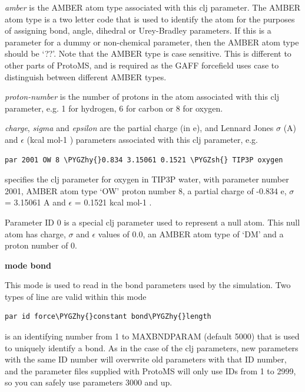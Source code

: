 \documentclass[letterpaper,10pt,english]{sphinxmanual}
\def\PYGZsh{\char`\#}
\def\PYGZhy{\char`\-}
\begin{document}
\emph{amber} is the AMBER atom type associated with this clj parameter. The AMBER atom type is a two letter code that is used to identify the atom for the purposes of assigning bond, angle, dihedral or Urey-Bradley parameters. If this is a parameter for a dummy or non-chemical parameter, then the AMBER atom type should be ‘??’. Note that the AMBER type is case sensitive. This is different to other parts of ProtoMS, and is required as the GAFF forcefield uses case to distinguish between different AMBER types.

\emph{proton-number} is the number of protons in the atom associated with this clj parameter, e.g. 1 for hydrogen, 6 for carbon or 8 for oxygen.

\emph{charge}, \emph{sigma} and \emph{epsilon} are the partial charge (in \textbar{}e\textbar{}), and Lennard Jones \(\sigma\) (A) and \(\epsilon\) (kcal mol-1 ) parameters associated with this clj parameter, e.g.

\begin{Verbatim}[commandchars=\\\{\}]
par 2001 OW 8 \PYGZhy{}0.834 3.15061 0.1521 \PYGZsh{} TIP3P oxygen
\end{Verbatim}

specifies the clj parameter for oxygen in TIP3P water, with parameter number 2001, AMBER atom type ‘OW’ proton number 8, a partial charge of -0.834 \textbar{}e\textbar{}, \(\sigma\) = 3.15061 A and \(\epsilon\) = 0.1521 kcal mol-1 .

Parameter ID 0 is a special clj parameter used to represent a null atom. This null atom has charge, \(\sigma\) and \(\epsilon\) values of 0.0, an AMBER atom type of ‘DM’ and a proton number of 0.

\textbf{mode bond}

This mode is used to read in the bond parameters used by the simulation. Two types of line are valid within this mode

\begin{Verbatim}[commandchars=\\\{\}]
par id force\PYGZhy{}constant bond\PYGZhy{}length
\end{Verbatim}

 is an identifying number from 1 to MAXBNDPARAM (default 5000) that is used to uniquely identify a bond. As in the case of the clj parameters, new parameters with the same ID number will overwrite old parameters with that ID number, and the parameter files supplied with ProtoMS will only use IDs from 1 to 2999, so you can safely use parameters 3000 and up.
\end{document}
